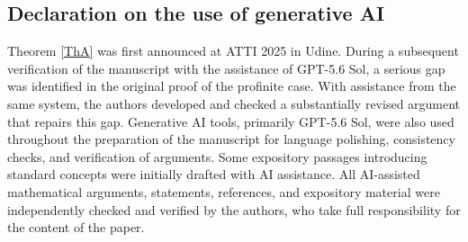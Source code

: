\documentclass[12pt]{amsart}
\theoremstyle{definition}
\numberwithin{equation}{section}
\theoremstyle{remark}
\begin{document}
\subsection*{Declaration on the use of generative AI}
Theorem \ref{ThA} was first announced at ATTI 2025 in Udine. During a subsequent verification of the manuscript with the assistance of GPT-5.6 Sol, a serious gap was identified in the original proof of the profinite case. With assistance from the same system, the authors developed and checked a substantially revised argument that repairs this gap. Generative AI tools, primarily GPT-5.6 Sol, were also used throughout the preparation of the manuscript for language polishing, consistency checks, and verification of arguments. Some expository passages introducing standard concepts were initially drafted with AI assistance. All AI-assisted mathematical arguments, statements, references, and expository material were independently checked and verified by the authors, who take full responsibility for the content of the paper.
\end{document}
